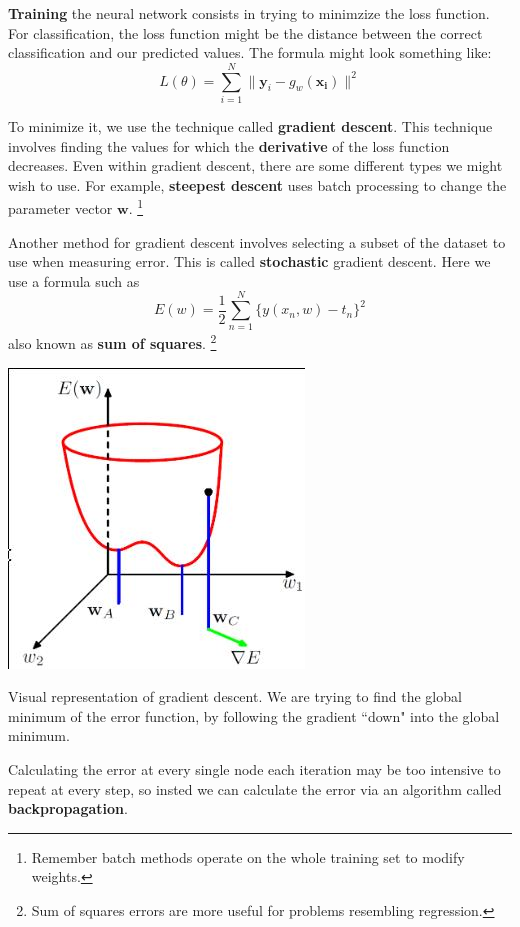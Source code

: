 \documentclass{tufte-handout}
\begin{document}
\textbf{Training} the neural network consists in trying to minimzize the loss function. 
For classification, the loss function might be the distance between the correct classification
	and our predicted values.
The formula might look something like:
\[ L(\theta) = \sum_{i=1}^{N}\|\mathbf{y}_{i} -  g_{w}(\mathbf{x_{i}})\|^{2}\]

To minimize it, we use the technique called \textbf{gradient descent}. 
This technique involves finding the values for which the \textbf{derivative} of the loss function decreases. 
Even within gradient descent, there are some different types we might wish to use. 
For example, \textbf{steepest descent} uses batch processing to change the parameter vector $\mathbf{w}$.
\footnote{Remember batch methods operate on the whole training set to modify weights.}

Another method for gradient descent involves selecting a subset of the dataset to use when measuring 
	error.
This is called \textbf{stochastic} gradient descent. 
Here we use a formula such as 
\[E(w) = \frac{1}{2}\sum_{n=1}^{N}\{y(x_{n}, w) - t_{n}\}^{2}\]
also known as \textbf{sum of squares}.
\footnote{Sum of squares errors are more useful for problems resembling regression.}
\begin{marginfigure}
	\includegraphics[scale=0.3]{gradient_descent}
	\caption{Visual representation of gradient descent. We are trying to find the global
		minimum of the error function, by following the gradient ``down" into the global 
		minimum.}
\end{marginfigure}

Calculating the error at every single node each iteration may be too intensive to repeat at every step,
	so insted we can calculate the error via an algorithm called \textbf{backpropagation}.
\end{document}
